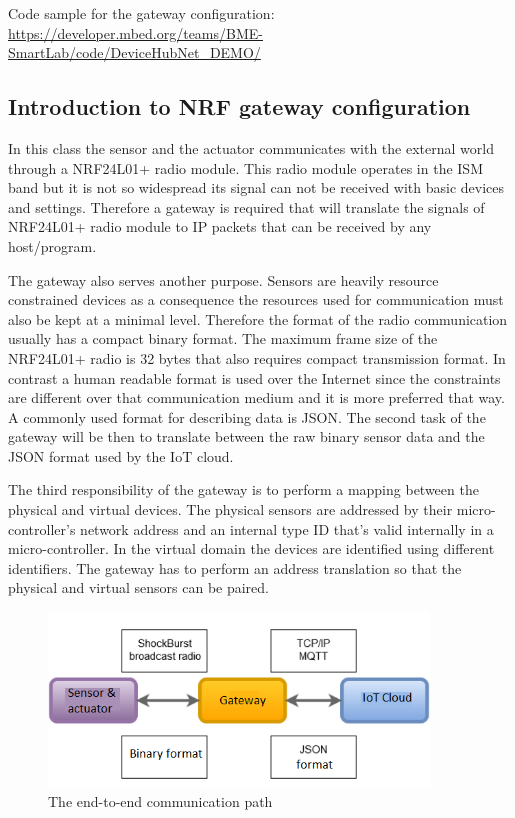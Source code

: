 \documentclass[a4paper]{article}
\begin{document}
Code sample for the gateway configuration: 
\url{https://developer.mbed.org/teams/BME-SmartLab/code/DeviceHubNet_DEMO/}

\subsection{Introduction to NRF gateway configuration}

In this class the sensor and the actuator communicates with the external world through
a NRF24L01+ radio module. This radio module operates in the ISM band but it is not so 
widespread its signal can not be received with basic devices and settings. Therefore a
gateway is required that will translate the signals of NRF24L01+ radio module to IP packets
that can be received by any host/program.

The gateway also serves another purpose. Sensors are heavily resource constrained devices as 
a consequence the resources used for communication must also be kept at a minimal level.
Therefore the format of the radio communication usually has a compact binary format.
The maximum frame size of the NRF24L01+ radio is 32 bytes that also requires compact transmission
format. In contrast a human readable format is used over the Internet since
the constraints are different over that communication medium and it is more preferred that way.
A commonly used format for describing data is JSON. The second task of the gateway will be then
to translate between the raw binary sensor data and the JSON format used by the IoT cloud.

The third responsibility of the gateway is to perform a mapping between the physical and virtual
devices. The physical sensors are addressed by their micro-controller's network address and an 
internal type ID that's valid internally in a micro-controller.
In the virtual domain the devices are identified using different identifiers. The gateway
has to perform an address translation so that the physical and virtual sensors can be paired.

\begin{figure}[H]
    \centering
    \includegraphics[width=0.9\textwidth]{figures/gateway.png}
    \caption{The end-to-end communication path}
    \label{fig:gateway}
\end{figure}
\end{document}
